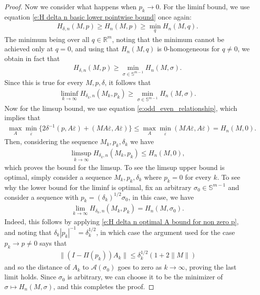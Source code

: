 \documentclass[10pt,a4paper]{amsart}
\begin{document}
\begin{proof}
Now we consider what happens when $p_k \to 0$. For the liminf bound, we  use equation \eqref{e:H delta n basic lower pointwise bound} once again:
\begin{align*}
  H_{\delta,n}(M,p) \geq H_{n}(M,p) \geq \min_{q}H_{n}(M,q).
\end{align*}
The minimum being over all $q\in\mathbb{R}^m$, noting that the minimum cannot be achieved only at $q=0$, and using that $H_n(M,q)$ is $0$-homogeneous for $q\neq 0$, we obtain in fact that  
\begin{align*}
  H_{\delta,n}(M,p) \geq \min_{\sigma \in \mathbb{S}^{m-1}}H_{n}(M,\sigma).
\end{align*}
Since this is true for every $M,p,\delta$, it follows that
\begin{align*}
  \liminf_{k \to \infty} H_{\delta_k,n}(M_k,p_k) \geq \min_{\sigma \in \mathbb{S}^{m-1}}H_n(M,\sigma).    
\end{align*}
Now for the limsup bound, we use equation \eqref {e:odd_even_relationship}, which implies that
\begin{align*}
  \max_A \min_{\overline\varepsilon}\{2\delta^{-1}(p,A\overline \varepsilon)+ (MA\overline \varepsilon,A\overline \varepsilon)\} \leq \max_A \min_{\overline\varepsilon} (MA\overline \varepsilon,A\overline \varepsilon) = H_n(M,0).
\end{align*}
Then, considering the sequence $M_k,p_k,\delta_k$ we have
\begin{align*}
  \limsup_{k \to \infty} H_{\delta_k,n}(M_k,p_k) \leq H_n(M,0),
\end{align*}
which proves the bound for the limsup. To see the limsup upper bound is optimal, simply consider a sequence $M_k,p_k,\delta_k$ where $p_k = 0$ for every $k$. To see why the lower bound for the liminf is optimal, fix an arbitrary $\sigma_0 \in \mathbb{S}^{m-1}$ and consider a sequence with $p_k = (\delta_k)^{1/2}\sigma_0$, in this case, we have
\begin{align*}
  \lim_{k \to \infty} H_{\delta_k,n}(M_k,p_k) = H_n(M,\sigma_0).  
\end{align*}
Indeed, this follows by applying \eqref{e:H delta n optimal A bound for non zero p}, and noting that $\delta_k|p_k|^{-1} = \delta_k^{1/2}$, in which case the argument used for the case $p_k \to p \neq 0$ says that
\begin{align*}
  \|(I-\Pi(p_k))A_k\| \leq \delta_k^{1/2}(1+2\|M\|)    
\end{align*}
and so the distance of $A_k$ to $\mathcal{A}(\sigma_0)$ goes to zero as $k\to \infty$, proving the last limit holds. Since $\sigma_0$ is arbitrary, we can choose it to be the minimizer of $\sigma \mapsto H_n(M,\sigma)$, and this completes the proof.

\end{proof}
\end{document}
